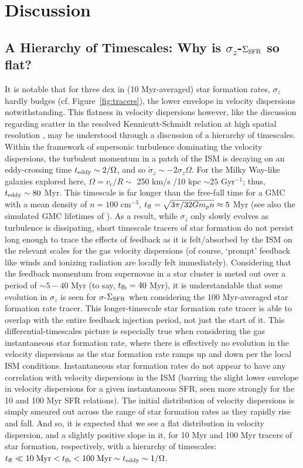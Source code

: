 \documentclass[usletter,fleqn,usenatbib]{mnras}
\begin{document}
\section{Discussion}
\subsection{A Hierarchy of Timescales: Why is $\sigma_z$-$\Sigma_{\rm SFR}$ so flat?}\label{sec:theory1}
It is notable that for three dex in (10 Myr-averaged) star formation rates, $\sigma_z$ hardly budges (cf. Figure~\ref{fig:tracers}), the lower envelope in velocity dispersions notwithstanding.  This flatness in velocity dispersions however, like the discussion regarding scatter in the resolved Kennicutt-Schmidt relation at high spatial resolution \citep{Schruba2010,Kruijssen2014,Orr2019}, may be understood through a discussion of a hierarchy of timescales.  Within the framework of supersonic turbulence dominating the velocity dispersions, the turbulent momentum in a patch of the ISM is decaying on an eddy-crossing time $t_{\rm eddy} \sim 2/\Omega$, and so $\dot\sigma_z \sim -2\sigma_z\Omega$.  For the Milky Way-like galaxies explored here, $\Omega = v_c/R \sim$ 250 km/s /10 kpc $\sim 25$ Gyr$^{-1}$; thus, $t_{\rm eddy} \sim 80$ Myr.  This timescale is far longer than the free-fall time for a GMC with a mean density of $n=100$ cm$^{-3}$, $t_{\rm ff} = \sqrt{3 \pi / 32 G m_p n} \approx 5$ Myr (see also the simulated GMC lifetimes of \citealt{Grudic2018}).  As a result, while $\sigma_z$ only slowly evolves as turbulence is dissipating, short timescale tracers of star formation do not persist long enough to trace the effects of feedback as it is felt/absorbed by the ISM on the relevant scales for the gas velocity dispersions (of course, `prompt' feedback like winds and ionizing radiation are locally felt immediately).  Considering that the feedback momentum from supernovae in a star cluster is meted out over a period of $\sim 5-40$ Myr (to say, $t_{\rm fb} = 40$ Myr), it is understandable that some evolution in $\sigma_z$ is seen for $\sigma$-$\Sigma_{\rm SFR}$ when considering the 100 Myr-averaged star formation rate tracer. This longer-timescale star formation rate tracer is able to overlap with the entire feedback injection period, not just the start of it.  This differential-timescales picture is especially true when considering the gas instantaneous star formation rate, where there is effectively no evolution in the velocity dispersions as the star formation rate ramps up and down per the local ISM conditions.  Instantaneous star formation rates do not appear to have any correlation with velocity dispersions in the ISM (barring the slight lower envelope in velocity dispersions for a given instantaneous SFR, seen more strongly for the 10 and 100 Myr SFR relations).  The initial distribution of velocity dispersions is simply smeared out across the range of star formation rates as they rapidly rise and fall.  And so, it is expected that we see a flat distribution in velocity dispersion, and a slightly positive slope in it, for 10 Myr and 100 Myr tracers of star formation, respectively, with a hierarchy of timescales: $t_{\rm ff} \ll 10\; {\rm Myr} < t_{\rm fb} < 100 \; {\rm Myr} \sim t_{\rm eddy} \sim 1/\Omega$.
\end{document}
